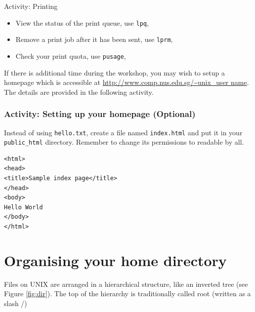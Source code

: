 \begin{frame}{Activity: Printing}

\begin{itemize}
\item View the status of the print queue, use \texttt{lpq}, 
\item Remove a print job after it has been sent, use \texttt{lprm}, 
\item Check your print quota, use \texttt{pusage}, 
\end{itemize}

\end{frame}

If there is additional time during the workshop, you may wish to setup a
homepage which is accessible at \url{http://www.comp.nus.edu.sg/~unix_user name}.
The details are provided in the following activity.  

\begin{frame}[fragile]
\frametitle{Activity: Setting up your homepage (Optional)}
Instead of using \texttt{hello.txt}, create a file named \texttt{index.html} and
put it in your \texttt{public\_html} directory. Remember to change its
permissions to readable by all.  

\begin{verbatim}
<html>
<head>
<title>Sample index page</title>
</head>
<body>
Hello World
</body>
</html>
\end{verbatim}
\end{frame}

\section{Organising your home directory}
Files on UNIX are arranged in a hierarchical structure, like an inverted tree
(see Figure \ref{fig:dir}).  The top of the hierarchy is traditionally called
root (written as a slash /)

